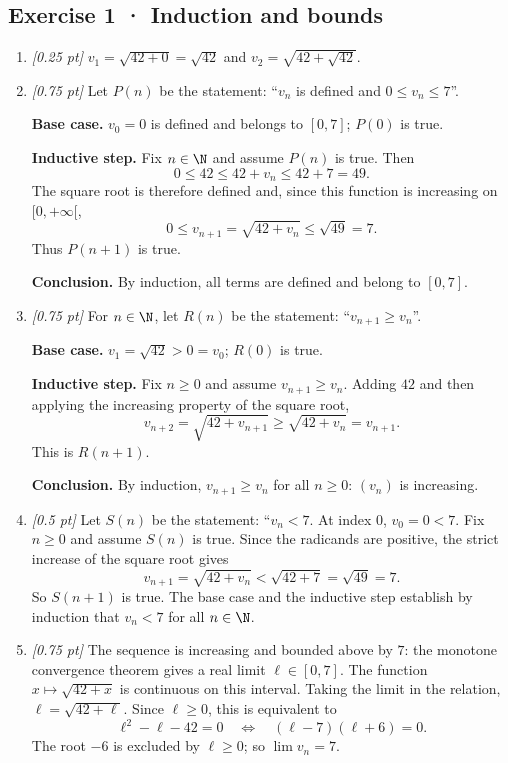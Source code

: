 \subsection*{Exercise 1 · Induction and bounds}\begin{enumerate}

\item \textit{[0.25 pt]} $v_1=\sqrt{42+0}=\sqrt{42}$ and $v_2=\sqrt{42+\sqrt{42}}$.

\item \textit{[0.75 pt]} Let $P(n)$ be the statement: ``$v_n$ is defined and $0\le v_n\le 7$''.
\par\smallskip\textbf{Base case.} $v_0=0$ is defined and belongs to $[0,7]$; $P(0)$ is true.
\par\smallskip\textbf{Inductive step.} Fix $n\in\N$ and assume $P(n)$ is true. Then
\[0\le 42\le 42+v_n\le 42+7=49.\]
The square root is therefore defined and, since this function is increasing on $[0,+\infty[$,
\[0\le v_{n+1}=\sqrt{42+v_n}\le\sqrt{49}=7.\]
Thus $P(n+1)$ is true.
\par\smallskip\textbf{Conclusion.} By induction, all terms are defined and belong to $[0,7]$.

\item \textit{[0.75 pt]} For $n\in\N$, let $R(n)$ be the statement: ``$v_{n+1}\ge v_n$''.
\par\smallskip\textbf{Base case.} $v_1=\sqrt{42}>0=v_0$; $R(0)$ is true.
\par\smallskip\textbf{Inductive step.} Fix $n\ge0$ and assume $v_{n+1}\ge v_n$. Adding $42$ and then applying the increasing property of the square root,
\[v_{n+2}=\sqrt{42+v_{n+1}}\ge\sqrt{42+v_n}=v_{n+1}.\]
This is $R(n+1)$.
\par\smallskip\textbf{Conclusion.} By induction, $v_{n+1}\ge v_n$ for all $n\ge0$: $(v_n)$ is increasing.

\item \textit{[0.5 pt]} Let $S(n)$ be the statement: ``$v_n<7$. At index $0$, $v_0=0<7$.
Fix $n\ge0$ and assume $S(n)$ is true. Since the radicands are positive, the strict increase of the square root gives
\[v_{n+1}=\sqrt{42+v_n}<\sqrt{42+7}=\sqrt{49}=7.\]
So $S(n+1)$ is true. The base case and the inductive step establish by induction that $v_n<7$ for all $n\in\N$.

\item \textit{[0.75 pt]} The sequence is increasing and bounded above by $7$: the monotone convergence theorem gives a real limit $\ell\in[0,7]$.
The function $x\mapsto\sqrt{42+x}$ is continuous on this interval. Taking the limit in the relation, $\ell=\sqrt{42+\ell}$. Since $\ell\ge0$, this is equivalent to
\[\ell^2-\ell-42=0\quad\Longleftrightarrow\quad(\ell-7)(\ell+6)=0.\]
The root $-6$ is excluded by $\ell\ge0$; so $\lim v_n=7$.


\end{enumerate}
